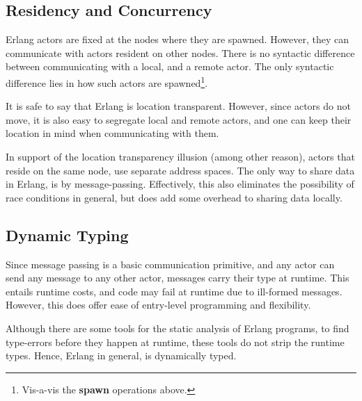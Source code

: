 \subsection{Residency and Concurrency}

Erlang actors are fixed at the nodes where they are spawned. However,
they can communicate with actors resident on other nodes. There is no
syntactic difference between communicating with a local, and a remote
actor. The only syntactic difference lies in how such actors are
spawned\footnote{Vis-a-vis the \textbf{spawn} operations above.}.

It is safe to say that Erlang is location transparent. However, since
actors do not move, it is also easy to segregate local and remote
actors, and one can keep their location in mind when communicating
with them.

In support of the location transparency illusion (among other reason),
actors that reside on the same node, use separate address spaces. The
only way to share data in Erlang, is by message-passing. Effectively,
this also eliminates the possibility of race conditions in general,
but does add some overhead to sharing data locally.

\subsection{Dynamic Typing}

Since message passing is a basic communication primitive, and any
actor can send any message to any other actor, messages carry their
type at runtime. This entails runtime costs, and code may fail at
runtime due to ill-formed messages. However, this does offer ease of
entry-level programming and flexibility.

Although there are some tools for the static analysis of Erlang
programs, to find type-errors before they happen at runtime, these
tools do not strip the runtime types. Hence, Erlang in general, is
dynamically typed.
